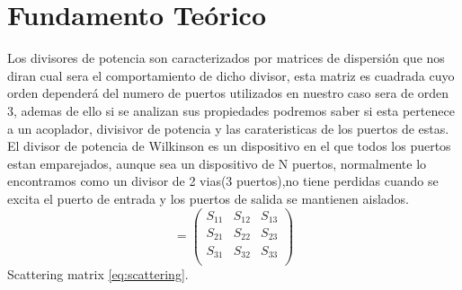 \documentclass[a4paper]{IEEEtran} %
\begin{document}
\section{Fundamento Teórico}
\label{sec:fundamento}
Los divisores de potencia son caracterizados por matrices de dispersión que nos diran cual sera el comportamiento de dicho divisor, esta matriz es cuadrada cuyo orden dependerá del numero de puertos utilizados en nuestro caso sera de orden 3, ademas de ello si se analizan sus propiedades podremos saber si esta pertenece a un acoplador, divisivor de potencia y las carateristicas de los puertos de estas\cite{pozar2012microwave}. El divisor de potencia de Wilkinson es un dispositivo en el que todos los puertos estan emparejados, aunque sea un dispositivo de N puertos, normalmente lo encontramos como un divisor de 2 vias(3 puertos),no tiene perdidas cuando se excita el puerto de entrada y los puertos de salida se mantienen aislados.
\vspace{5mm}
\begin{equation}
[S]=
\begin{pmatrix}
S_{11}&S_{12}&S_{13}\\
S_{21}&S_{22}&S_{23}\\
S_{31}&S_{32}&S_{33}\\
\end{pmatrix}
\label{eq:scattering}
\end{equation}
Scattering matrix \ref{eq:scattering}.
\vspace{5mm}
\end{document}
